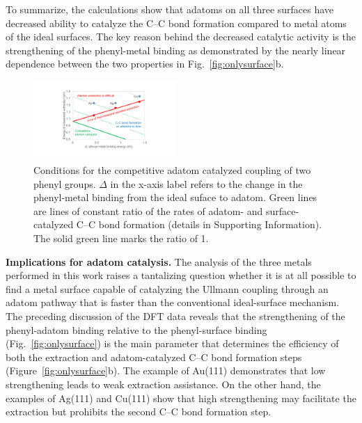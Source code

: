 \documentclass[aps,prb,amsmath,amssymb,11pt]{revtex4-1}
\newcommand{\sinfo}{Supporting Information}
\renewcommand{\sout}[1]{\unskip}
\begin{document}
To summarize, the calculations show that adatoms on all three surfaces have decreased ability to catalyze the C--C bond formation compared to metal atoms of the ideal surfaces. 
The key reason behind the decreased catalytic activity is the strengthening of the phenyl-metal binding as demonstrated by the nearly linear dependence between the two properties in Fig.~\ref{fig:onlysurface}b.

\begin{figure}[bt]
\centering
\includegraphics[width=0.48\textwidth]{Fig/conclusion.pdf}
\caption{Conditions for the competitive adatom catalyzed coupling of two phenyl groups. $\Delta$ in the x-axis label refers to the change in the phenyl-metal binding from the ideal suface to adatom. Green lines are lines of constant ratio of the rates of adatom- and surface-catalyzed C--C bond formation (details in \sinfo). The solid green line marks the ratio of 1. %
} 
\label{fig:conclusion}
\end{figure}

\textbf{Implications for adatom catalysis.} 
%
The analysis of the three metals performed in this work raises a tantalizing question whether it is at all possible to find a metal surface capable of catalyzing the Ullmann coupling through an adatom pathway that is faster than the conventional ideal-surface mechanism. 
The preceding discussion of the DFT data reveals that the strengthening of the phenyl-adatom binding relative to the phenyl-surface binding (Fig.~\ref{fig:onlysurface}) is the main parameter that determines the efficiency of both the extraction and adatom-catalyzed C--C bond formation steps (Figure~\ref{fig:onlysurface}b).
The example of Au(111) demonstrates that low strengthening leads to weak extraction assistance\sout{, which makes the extraction step uncompetitive}. On the other hand, the examples of Ag(111) and Cu(111) show that high strengthening may facilitate the extraction but prohibits the second C--C bond formation step. 
\end{document}
